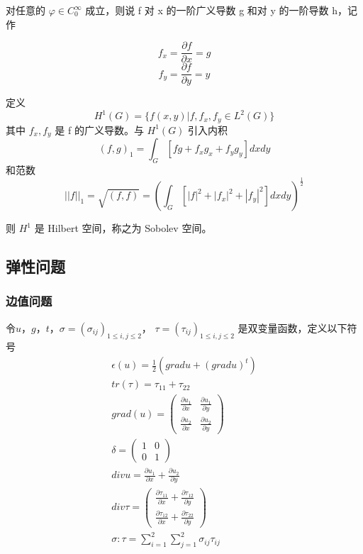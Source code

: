 \documentclass[a4paper,UTF8,titlepage]{ctexart}
\begin{document}
对任意的 $\varphi \in C_0^{\infty}$ 成立，则说 f 对 x 的一阶广义导数 g 和对 y 的一阶导数 h，记作

\begin{equation}
	f_x = \frac{\partial f}{\partial x} = g
\end{equation}
\begin{equation}
	f_y = \frac{\partial f}{\partial y} = y
\end{equation}

定义 
$$
	H^1(G) = \{f(x,y) | f, f_x, f_y \in L^2(G) \}
$$
其中 $f_x, f_y $ 是 f 的广义导数。与 $H^1(G)$ 引入内积
\begin{equation}
	(f,g)_1 = \int_G [fg + f_x g_x + f_y g_y] dxdy
\end{equation}
和范数
\begin{equation}
	||f||_1 = \sqrt{(f,f)} = (\int_G [|f|^2 + |f_x|^2 + |f_y|^2] dxdy )^{\frac{1}{2}}
\end{equation}

则 $H^1$ 是 Hilbert 空间，称之为 Sobolev 空间。

\subsection{弹性问题}

\subsubsection{边值问题}

令$u$，$g$，$t$，$\sigma=(\sigma_{ij})_{1 \le i,j \le 2}$， $\tau = (\tau_{ij})_{1\le i,j \le 2}$ 是双变量函数，定义以下符号
$$
\begin{matrix}
	\epsilon(u) = \frac{1}{2} (grad u + (grad u)^t) \\
	tr(\tau) = \tau_{11} + \tau_{22} \\
	grad(u) = \begin{pmatrix}
		\frac{\partial u_1}{\partial x} & \frac{\partial u_1}{\partial y} \\
		\frac{\partial u_2}{\partial x} &
		\frac{\partial u_2}{\partial y}
	\end{pmatrix} \\
	\delta = \begin{pmatrix}
		1 & 0 \\
		0 & 1
	\end{pmatrix} \\
	div u = \frac{\partial u_1}{\partial x} + \frac{\partial u_2}{\partial y} \\
	div \tau = \begin{pmatrix}
		\frac{\partial \tau_{11}}{\partial x} + \frac{\partial \tau_{12}}{\partial y} \\
		\frac{\partial \tau_{12}}{\partial x} + \frac{\partial \tau_{22}}{\partial 
			y} 
	\end{pmatrix} \\
	\sigma : \tau = \sum\limits_{i=1}^{2} \sum\limits_{j=1}^{2} \sigma_{ij} \tau_{ij}
\end{matrix}
$$
\end{document}
